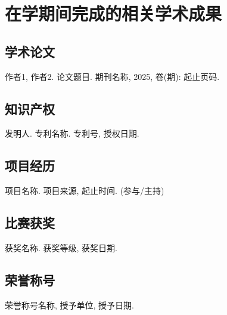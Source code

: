 
\chapter{在学期间完成的相关学术成果}

\section{学术论文}

\begin{enumerate}[label={[\arabic*]}]
  \item 作者1, 作者2. 论文题目. 期刊名称, 2025, 卷(期): 起止页码.
\end{enumerate}

\section{知识产权}

\begin{enumerate}[label={[\arabic*]}]
  \item 发明人. 专利名称. 专利号, 授权日期.
\end{enumerate}

\section{项目经历}

\begin{enumerate}[label={[\arabic*]}]
  \item 项目名称. 项目来源, 起止时间. (参与/主持)
\end{enumerate}

\section{比赛获奖}

\begin{enumerate}[label={[\arabic*]}]
  \item 获奖名称. 获奖等级, 获奖日期.
\end{enumerate}

\section{荣誉称号}

\begin{enumerate}[label={[\arabic*]}]
  \item 荣誉称号名称, 授予单位, 授予日期.
\end{enumerate}
